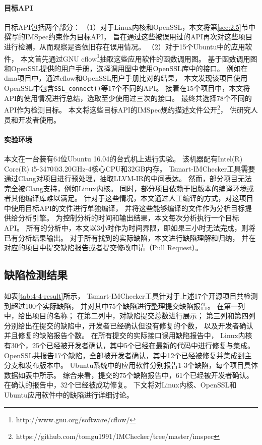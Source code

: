 \paragraph{目标API}
目标API包括两个部分：
（1）对于Linux内核和OpenSSL，本文将第\ref{sec:2.5}节中撰写的IMSpec约束作为目标API，
旨在通过这些被误用过的API再次对这些项目进行检测，从而观察是否依旧存在误用情况。
（2）对于15个Ubuntu中的应用软件，
本文首先通过GNU cflow\footnote{http://www.gnu.org/software/cflow/}抽取这些应用软件的函数调用图。
基于函数调用图和OpenSSL提供的用户手册，选择调用图中使用OpenSSL库中的接口。
例如在dma项目中，通过cflow和OpenSSL用户手册比对的结果，
本文发现该项目使用OpenSSL中包含\texttt{SSL\_connect()}等17个不同的API。
接着在15个项目中，本文将API的使用情况进行总结，选取至少使用过三次的接口。
最终共选择78个不同的API作为检测目标。
本文将这些目标API的IMSpec规约描述文件公开\footnote{https://github.com/tomgu1991/IMChecker/tree/master/imspec}，
供研究人员和开发者使用。




\paragraph{实验环境}
本文在一台装有64位Ubuntu 16.04的台式机上进行实验。
该机器配有Intel(R) Core(R) i5-3470@3.20GHz-4核心CPU和32GB内存。
Tsmart-IMChecker工具需要通过Clang对项目进行预处理，抽取LLVM-IR的中间表达。
然而，部分项目无法完全被Clang支持，例如Linux内核。
同时，部分项目依赖于旧版本的编译环境或者其他编译库难以满足。
针对于这些情况，本文通过人工编译的方式，对这项目中使用目标API的文件进行单独编译，
并将这些能够编译的文件作为分析目标提供给分析引擎。
为控制分析的时间和输出结果，本文每次分析执行一个目标API。
所有的分析中，本文以3小时作为时间界限，即如果三小时无法完成，则将已有分析结果输出。
对于所有找到的实际缺陷，本文进行缺陷理解和归纳，
并在对应的项目中提交缺陷报告或者提交修改申请（Pull Request）。

\subsection{缺陷检测结果}

如表\ref{tab:4-4-result}所示，
Tsmart-IMChecker工具针对于上述17个开源项目共检测到超过100个实际缺陷，
并对其中75个缺陷进行整理提交缺陷报告。
在第一列中，给出项目的名称；
在第二列中，对缺陷提交总数进行展示；
第三列和第四列分别给出在提交的缺陷中，开发者已经确认但没有修复的个数，
以及开发者确认并且修复的缺陷报告个数。
在所有提交的实际接口误用缺陷报告中，
Linux内核有30个，25个已经被开发者确认，其中5个已经在最新的代码中进行修复与集成。
OpenSSL共报告17个缺陷，全部被开发者确认，其中12个已经被修复并集成到主分支和发布版本中。
Ubuntu系统中的应用软件分别报告1-3个缺陷，每个项目具体数据如表中所示。
综合来看，提交的75个缺陷报告中，61个已经被开发者确认。
在确认的报告中，32个已经被成功修复。
下文将对Linux内核、OpenSSL和Ubuntu应用软件中的缺陷进行详细讨论。

